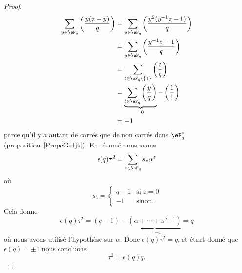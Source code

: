 \begin{proof}
	\begin{subequations}
		\begin{align}
			\sum_{y\in \eF_q}\left(\frac{y(z-y)}{q}\right) & =\sum_{y\in \eF_q}\left(\frac{y^2(y^{-1}z-1)}{q}\right)                               \\
			                                               & =\sum_{y\in \eF_q}\left(\frac{y^{-1}z-1}{q}\right)                                    \\
			                                               & =\sum_{t\in \eF_q\setminus\{ 1 \}}\left(\frac{t}{q}\right)                            \\
			                                               & =\underbrace{\sum_{t\in \eF_q}\left(\frac{y}{q}\right)}_{=0}-\left(\frac{1}{1}\right) \\
			                                               & =-1
		\end{align}
	\end{subequations}
	parce qu'il  y a autant de carrés que de non carrés dans \( \eF_q^*\) (proposition~\ref{PropcGsJjk}). En résumé nous avons
	\begin{equation}
		\epsilon(q)\tau^2=\sum_{z\in \eF_q}s_z\alpha^z
	\end{equation}
	où
	\begin{equation}
		s_z=\begin{cases}
			q-1 & \text{si } z=0 \\
			-1  & \text{sinon}.
		\end{cases}
	\end{equation}
	Cela donne
	\begin{equation}
		\epsilon(q)\tau^2=(q-1)-\underbrace{(\alpha+\cdots +\alpha^{q-1})}_{=-1}=q
	\end{equation}
	où nous avons utilisé l'hypothèse sur \( \alpha\). Donc \( \epsilon(q)\tau^2=q\), et étant donné que \( \epsilon(q)=\pm 1\) nous concluons
	\begin{equation}
		\tau^2=\epsilon(q)q.
	\end{equation}


\end{proof}
